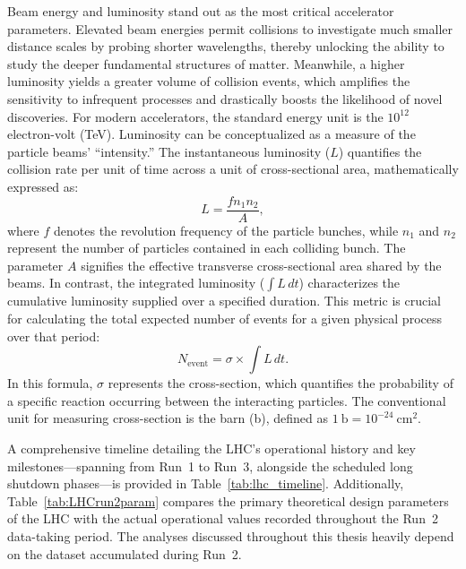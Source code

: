 Beam energy and luminosity stand out as the most critical accelerator parameters. Elevated beam energies permit collisions to investigate much smaller distance scales by probing shorter wavelengths, thereby unlocking the ability to study the deeper fundamental structures of matter. Meanwhile, a higher luminosity yields a greater volume of collision events, which amplifies the sensitivity to infrequent processes and drastically boosts the likelihood of novel discoveries. For modern accelerators, the standard energy unit is the $10^{12}$ electron-volt (TeV). 
Luminosity can be conceptualized as a measure of the particle beams' ``intensity.'' The instantaneous luminosity ($L$) quantifies the collision rate per unit of time across a unit of cross-sectional area, mathematically expressed as:
\begin{equation}
    L = \frac{f n_1 n_2}{A},
\end{equation}
where $f$ denotes the revolution frequency of the particle bunches, while $n_1$ and $n_2$ represent the number of particles contained in each colliding bunch. The parameter $A$ signifies the effective transverse cross-sectional area shared by the beams. In contrast, the integrated luminosity ($\int L\,dt$) characterizes the cumulative luminosity supplied over a specified duration. This metric is crucial for calculating the total expected number of events for a given physical process over that period:
\begin{equation}
    N_{\text{event}} = \sigma \times \int L \,dt .
\end{equation}
In this formula, $\sigma$ represents the cross-section, 
which quantifies the probability of a specific reaction occurring between the interacting particles. The conventional unit for measuring cross-section is the barn (b), defined as $1~\text{b} = 10^{-24}~\text{cm}^2$.

A comprehensive timeline detailing the LHC's operational history and key milestones—spanning from Run~1 to Run~3, alongside the scheduled long shutdown phases—is provided in Table~\ref{tab:lhc_timeline}. Additionally, Table~\ref{tab:LHCrun2param} compares the primary theoretical design parameters of the LHC with the actual operational values recorded throughout the Run~2 data-taking period. The analyses discussed throughout this thesis heavily depend on the dataset accumulated during Run~2.

